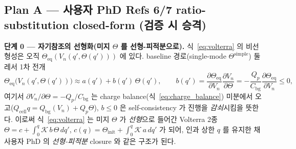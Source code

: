 \documentclass[11pt,a4paper]{article}
\newcommand{\eq}{\mathrm{eq}}
\newcommand{\bg}{\mathrm{bg}}
\newcommand{\cell}{\mathrm{cell}}
\newcommand{\simplecase}{\mathrm{simple}}
\begin{document}
\subsection{Plan A — 사용자 PhD Refs 6/7 ratio-substitution closed-form (검증 시 승격)}\label{sec:planA}
\textbf{단계 0 — 자기참조의 선형화(미지 $\Theta$ 를 선형-피적분으로).} 식~\eqref{eq:volterra} 의
비선형성은 오직 $\Theta_\eq(V_n(q',\Theta(q')))$ 에 있다. baseline 경로(single-mode $\Theta^\simplecase$)
둘레서 1차 전개
\begin{equation}
\Theta_\eq\big(V_n(q',\Theta(q'))\big)\approx a(q')+b(q')\,\Theta(q'),\qquad
b(q')=\frac{\partial\Theta_\eq}{\partial V_n}\frac{\partial V_n}{\partial\Theta}
=-\frac{Q_p}{C_\bg}\frac{\partial\Theta_\eq}{\partial V_n}\le0,
\label{eq:selfcoupling}
\end{equation}
여기서 $\partial V_n/\partial\Theta=-Q_p/C_\bg$ 는 charge balance(식~\eqref{eq:charge_balance}) 미분에서
오고($Q_\cell q=Q_\bg(V_n)+Q_p\Theta$), $b\le0$ 은 self-consistency 가 진행을 \emph{감쇠}시킴을 뜻한다.
이로써 식~\eqref{eq:volterra} 는 미지 $\Theta$ 가 \emph{선형}으로 들어간 Volterra 2종
$\Theta=c+\int_0^q\mathcal K\,b\,\Theta\,dq'$, $c(q)=\Theta_\mathrm{init}+\int_0^q\mathcal K\,a\,dq'$ 가 되어,
인과 상한 $q$ 를 유지한 채 사용자 PhD 의 \emph{선형-피적분} closure 와 같은 구조가 된다.
\end{document}

